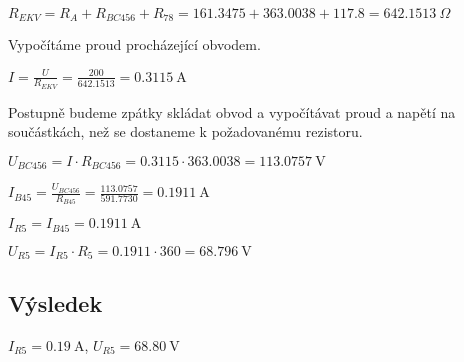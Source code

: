 \vspace{0.25cm}
$R_{EKV} = R_{A} + R_{BC456} + R_{78} = 161.3475 + 363.0038 + 117.8 = 642.1513\: \Omega$

\vspace{1cm}
\begin{large} \flushleft
Vypočítáme proud procházející obvodem.
\end{large}

\vspace{0.25cm}
$I = \frac{U}{R_{EKV}} = \frac{200}{642.1513} = 0.3115\: \si{\ampere}$

\vspace{1cm}
\begin{large} \flushleft
Postupně budeme zpátky skládat obvod a vypočítávat proud a napětí na součástkách, než se dostaneme k požadovanému rezistoru. 
\end{large}

\vspace{0.25cm}
$U_{BC456} = I \cdot R_{BC456} = 0.3115 \cdot 363.0038 = 113.0757\: \si{\volt}$

\vspace{0.25cm}
$I_{B45} = \frac{U_{BC456}}{R_{B45}} = \frac{113.0757}{591.7730} = 0.1911\: \si{\ampere}$

\vspace{0.25cm}
$I_{R5} = I_{B45} = 0.1911\: \si{\ampere}$

\vspace{0.25cm}
$U_{R5} = I_{R5} \cdot R_{5} = 0.1911 \cdot 360 = 68.796\: \si{\volt}$

\vspace{1cm}
\subsection{Výsledek}
$I_{R5} = 0.19\: \si{\ampere}$, $U_{R5} = 68.80\: \si{\volt}$
